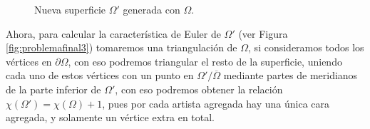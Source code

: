 \documentclass[oneside,11pt]{memoir}
\begin{document}
\begin{figure}[h]
\begin{center}
\begin{tikzpicture}[x=0.3pt,y=0.3pt,yscale=-1,xscale=1]
\end{tikzpicture}
    \end{center}
    \caption{Nueva superficie $\Omega'$ generada con $\Omega$.}
    \label{fig:problemafinal2}
\end{figure}
 Ahora, para calcular la característica de Euler de $\Omega'$ (ver Figura \ref{fig:problemafinal3}) tomaremos una triangulación de $\Omega$, si consideramos todos los vértices en $\partial\Omega$, con eso podremos triangular el resto de la superficie, uniendo cada uno de estos vértices con un punto en $\Omega'/\overline{\Omega}$ mediante partes de meridianos de la parte inferior de $\Omega'$, con eso podremos obtener la relación $\chi(\Omega')=\chi(\Omega)+1$, pues por cada artista agregada hay una única cara agregada, y solamente un vértice extra en total.
  \begin{figure}[h]
    \begin{center}
        \begin{tikzpicture}[x=0.3pt,y=0.3pt,yscale=-1,xscale=1]


\end{tikzpicture}
\end{center}
\end{figure}
\end{document}
